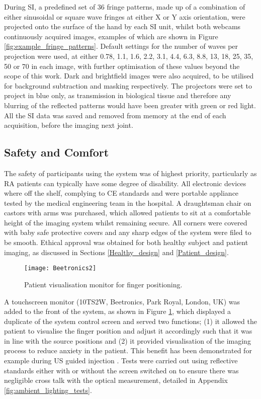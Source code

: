 \documentclass[twoside]{bhamthesis}
\theoremstyle{definition}
\begin{document}
During SI, a predefined set of 36 fringe patterns, made up of a combination of either sinusoidal or square wave fringes at either X or Y axis orientation, were projected onto the surface of the hand by each SI unit, whilst both webcams continuously acquired images, examples of which are shown in Figure \ref{fig:example_fringe_patterns}. Default settings for the number of waves per projection were used, at either 0.78, 1.1, 1.6, 2.2, 3.1, 4.4, 6.3, 8.8, 13, 18, 25, 35, 50 or 70 in each image, with further optimisation of these values beyond the scope of this work. Dark and brightfield images were also acquired, to be utilised for background subtraction and masking respectively. The projectors were set to project in blue only, as transmission in biological tissue and therefore any blurring of the reflected patterns would have been greater with green or red light. All the SI data was saved and removed from memory at the end of each acquisition, before the imaging next joint.

\subsection{Safety and Comfort}

The safety of participants using the system was of highest priority, particularly as RA patients can typically have some degree of disability. All electronic devices where off the shelf, complying to CE standards and were portable appliance tested by the medical engineering team in the hospital. A draughtsman chair on castors with arms was purchased, which allowed patients to sit at a comfortable height of the imaging system whilst remaining secure. All corners were covered with baby safe protective covers and any sharp edges of the system were filed to be smooth. Ethical approval was obtained for both healthy subject and patient imaging, as discussed in Sections \ref{Healthy_design} and \ref{Patient_design}.

\begin{figure}[!ht]
\centering
  \centering
  \texttt{[image: Beetronics2]}
\caption{Patient visualisation monitor for finger positioning.}
  \label{fig:visualisation monitor}
\end{figure}

A touchscreen monitor (10TS2W, Beetronics, Park Royal, London, UK) was added to the front of the system, as shown in Figure \ref{fig:visualisation monitor}, which displayed a duplicate of the system control screen and served two functions; (1) it allowed the patient to visualise the finger position and adjust it accordingly such that it was in line with the source positions and (2) it provided visualisation of the imaging process to reduce anxiety in the patient. This benefit has been demonstrated for example during US guided injection \cite{sahbudin2015observing}. Tests were carried out using reflective standards either with or without the screen switched on to ensure there was negligible cross talk with the optical measurement, detailed in Appendix \ref{fig:ambient_lighting_tests}. 
\end{document}
